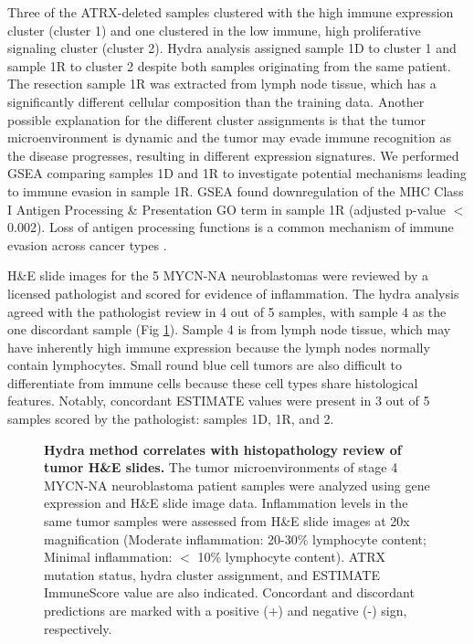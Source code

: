 \documentclass[10pt,letterpaper]{article}
\begin{document}
Three of the ATRX-deleted samples clustered with the high immune expression cluster (cluster 1) and one clustered in the low immune, high proliferative signaling cluster (cluster 2). Hydra analysis assigned sample 1D to cluster 1 and sample 1R to cluster 2 despite both samples originating from the same patient. The resection sample 1R was extracted from lymph node tissue, which has a significantly different cellular composition than the training data. Another possible explanation for the different cluster assignments is that the tumor microenvironment is dynamic and the tumor may evade immune recognition as the disease progresses, resulting in different expression signatures. We performed GSEA comparing samples 1D and 1R to investigate potential mechanisms leading to immune evasion in sample 1R. GSEA found downregulation of the MHC Class I Antigen Processing \& Presentation GO term in sample 1R (adjusted p-value $<$ 0.002). Loss of antigen processing functions is a common mechanism of immune evasion across cancer types \cite{reevesAntigenProcessingImmune2017}. 

H\&E slide images for the 5 MYCN-NA neuroblastomas were reviewed by a licensed pathologist and scored for evidence of inflammation. The hydra analysis agreed with the pathologist review in 4 out of 5 samples, with sample 4 as the one discordant sample (Fig \ref{hefig}). Sample 4 is from lymph node tissue, which may have inherently high immune expression because the lymph nodes normally contain lymphocytes. Small round blue cell tumors are also difficult to differentiate from immune cells because these cell types share histological features. Notably, concordant ESTIMATE values were present in 3 out of 5 samples scored by the pathologist: samples 1D, 1R, and 2. 

\begin{figure}[!h]
	\caption{{\bf Hydra method correlates with histopathology review of tumor H\&E slides.}
		The tumor microenvironments of stage 4 MYCN-NA neuroblastoma patient samples were analyzed using gene expression and H\&E slide image data. Inflammation levels in the same tumor samples were assessed from H\&E slide images at 20x magnification (Moderate inflammation: 20-30\% lymphocyte content; Minimal inflammation: $<$ 10\% lymphocyte content). ATRX mutation status, hydra cluster assignment, and ESTIMATE ImmuneScore value are also indicated. Concordant and discordant predictions are marked with a positive (+) and negative (-) sign, respectively.}
	\label{hefig}
\end{figure}
\end{document}
